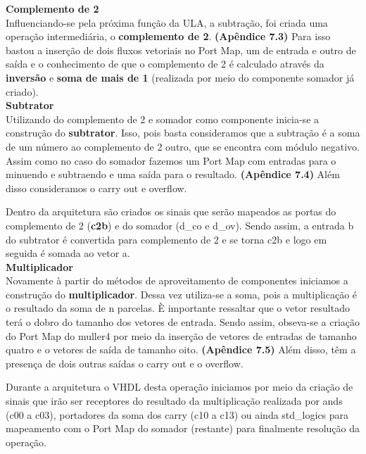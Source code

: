         \textbf{Complemento de 2}\\
        
        Influenciando-se pela próxima função da ULA, a subtração, foi criada uma operação intermediária, o \textbf{complemento de 2}. \textbf{(Apêndice 7.3)} Para isso bastou a inserção de dois fluxos vetoriais no Port Map, um de entrada e outro de saída e o conhecimento de que o complemento de 2 é calculado através da \textbf{inversão} e \textbf{soma de mais de 1} (realizada por meio do componente somador já criado).\\
        
        \textbf{Subtrator}\\

        Utilizando do complemento de 2 e somador como componente inicia-se a construção do \textbf{subtrator}. Isso, pois basta consideramos que a subtração é a soma de um número ao complemento de 2 outro, que se encontra com módulo negativo. Assim como no caso do somador fazemos um Port Map com entradas para o minuendo e subtraendo e uma saída para o resultado.\textbf{ (Apêndice 7.4)} Além disso consideramos o carry out e overflow.
        
        Dentro da arquitetura são criados os sinais que serão mapeados as portas do complemento de 2 (\textbf{c2b}) e do somador (d\_co e d\_ov). Sendo assim, a entrada b do subtrator é convertida para complemento de 2 e se torna c2b e logo em seguida é somada ao vetor a.\\
         
         \textbf{Multiplicador}\\
        
        Novamente à partir do métodos de aproveitamento de componentes iniciamos a construção do \textbf{multiplicador}. Dessa vez utiliza-se a soma, pois  a multiplicação é o resultado da soma de n parcelas. È importante ressaltar que o vetor resultado terá o dobro do tamanho dos vetores de entrada. Sendo assim, obseva-se a criação do Port Map do muller4 por meio da inserção de vetores de entradas de tamanho quatro e o vetores de saída de tamanho oito. \textbf{(Apêndice 7.5)} Além disso, têm a presença de dois outras saídas o carry out e o overflow.
        
        Durante a arquitetura o VHDL desta operação iniciamos por meio da criação de sinais que irão ser receptores do resultado da multiplicação realizada por ands (c00 a c03), portadores da soma dos carry (c10 a c13) ou ainda std\_logics para mapeamento com o Port Map do somador (restante) para finalmente resolução da operação. 


